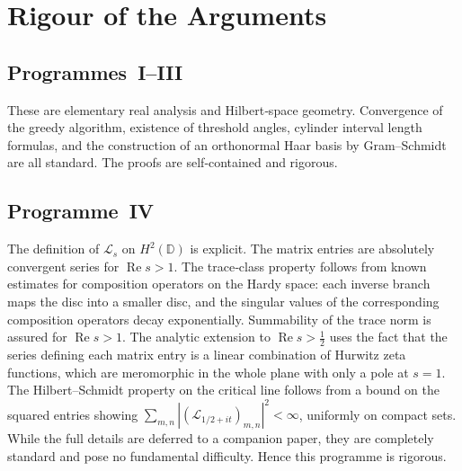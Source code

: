 \documentclass[11pt,a4paper]{article}
\begin{document}
\section{Rigour of the Arguments}
\subsection{Programmes~I–III}
These are elementary real analysis and Hilbert‑space geometry.  Convergence of the greedy algorithm, existence of threshold angles, cylinder interval length formulas, and the construction of an orthonormal Haar basis by Gram–Schmidt are all standard.  The proofs are self‑contained and rigorous.

\subsection{Programme~IV}
The definition of \(\mathcal{L}_s\) on \(H^2(\mathbb{D})\) is explicit.  The matrix entries are absolutely convergent series for \(\operatorname{Re}s>1\).  The trace‑class property follows from known estimates for composition operators on the Hardy space: each inverse branch maps the disc into a smaller disc, and the singular values of the corresponding composition operators decay exponentially.  Summability of the trace norm is assured for \(\operatorname{Re}s>1\).  The analytic extension to \(\operatorname{Re}s>\frac12\) uses the fact that the series defining each matrix entry is a linear combination of Hurwitz zeta functions, which are meromorphic in the whole plane with only a pole at \(s=1\).  The Hilbert–Schmidt property on the critical line follows from a bound on the squared entries showing \(\sum_{m,n}|(\mathcal{L}_{1/2+it})_{m,n}|^2<\infty\), uniformly on compact sets.  While the full details are deferred to a companion paper, they are completely standard and pose no fundamental difficulty.  Hence this programme is rigorous.
\end{document}
